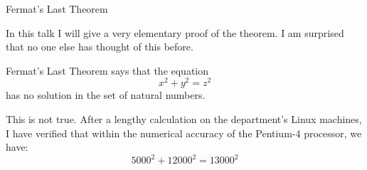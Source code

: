 \documentclass{beamer}
\begin{document}
 
 
\begin{frame}{Fermat's Last Theorem} 
 
In this talk I will give a very elementary proof of the 
theorem.  I am surprised that no one else has thought of 
this before. 
\medskip 
 
\pause 
 
Fermat's Last Theorem says that the equation 
\[ 
  x^2 + y^2 = z^2 
\] 
has no solution in the set of natural numbers. 
\medskip 
 
\pause 
 
This is not true.  After a lengthy calculation on the 
department's Linux machines, I have verified that within 
the numerical accuracy of the Pentium-4 processor, we have: 
\[ 
  5000^2 + 12000^2 = 13000^2 
\] 
 
\end{frame} 
 
\end{document}

